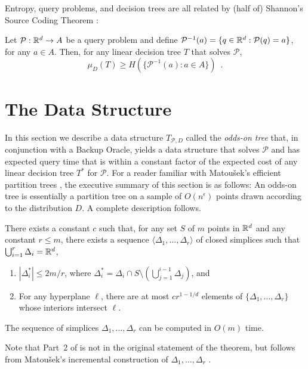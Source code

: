 \documentclass{patmorin}
\begin{document}
Entropy, query problems, and decision trees are all related by (half of)
Shannon's Source Coding Theorem \cite{s48}:

\begin{thm}
  Let $\mathcal{P}:\mathbb{R}^d\rightarrow A$ be a query problem and define
  $\mathcal{P}^{-1}(a)=\{q\in\mathbb{R}^d:\mathcal{P}(q)=a\}$, for any $a\in A$. Then,
  for any linear decision tree $T$ that solves $\mathcal{P}$,
  \[
    \mu_D(T) \ge H(\{\mathcal{P}^{-1}(a): a\in A\}) \enspace .
  \]
\end{thm}


\section{The Data Structure}

In this section we describe a data structure $T_{\mathcal{P},D}$ called
the \emph{odds-on tree} that, in conjunction with a Backup Oracle, yields
a data structure that solves $\mathcal{P}$ and has expected query time
that is within a constant factor of the expected cost of any
linear decision tree $T^*$ for $\mathcal{P}$.   For a reader familiar
with Matou\v{s}ek's efficient partition trees \cite{m92},  the executive
summary of this section is as follows: An odds-on tree is essentially a
partition tree on a sample of $O(n^\epsilon)$ points drawn according to
the distribution $D$.  A complete description follows.

\begin{thm}[Matou\v{s}ek 1992]
There exists a constant $c$ such that, for any set $S$ of $m$
points in $\mathbb{R}^d$ and any constant $r\le m$, there exists a sequence
$\langle \Delta_1,\ldots,\Delta_r\rangle$ of closed simplices such that
$\bigcup_{i=1}^r \Delta_i = \mathbb{R}^d$,
  \begin{enumerate}
    \item $|\Delta_i^*| \le 2m/r$, where $\Delta_i^*=\Delta_i \cap S\setminus
    \left(\bigcup_{j=1}^{i-1}\Delta_j\right)$, and
    \item For any hyperplane $\ell$, there are at most $cr^{1-1/d}$ elements of
  $\{\Delta_1,\ldots,\Delta_r\}$ whose interiors intersect $\ell$.
  \end{enumerate}
  The sequence of simplices $\Delta_1,\ldots,\Delta_r$ can be computed
  in $O(m)$ time.
\end{thm}

Note that Part~2 of  is not in the original
statement of the theorem, but follows from Matou\v{s}ek's incremental
construction of $\Delta_1,\ldots,\Delta_r$ \cite{m92}.
\end{document}
